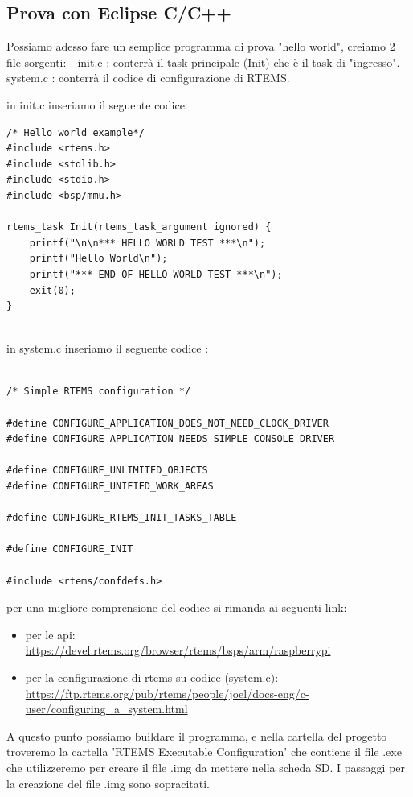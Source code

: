 \documentclass[12pt, a4paper]{article}
\begin{document}
\begin{flushleft}
\newpage
\section{Prova con Eclipse C/C++}

Possiamo adesso fare un semplice programma di prova "hello world",
creiamo 2 file sorgenti:
- init.c : conterrà il task principale (Init) che è il task di "ingresso".
- system.c : conterrà il codice di configurazione di RTEMS.

in init.c inseriamo il seguente codice:
\begin{lstlisting}[style=CStyle] 
/* Hello world example*/
#include <rtems.h>
#include <stdlib.h>
#include <stdio.h>
#include <bsp/mmu.h>

rtems_task Init(rtems_task_argument ignored) {
	printf("\n\n*** HELLO WORLD TEST ***\n");
	printf("Hello World\n");
	printf("*** END OF HELLO WORLD TEST ***\n");
	exit(0);
}


\end{lstlisting}
in system.c inseriamo il seguente codice :

\begin{lstlisting}[style=CStyle] 

/* Simple RTEMS configuration */

#define CONFIGURE_APPLICATION_DOES_NOT_NEED_CLOCK_DRIVER
#define CONFIGURE_APPLICATION_NEEDS_SIMPLE_CONSOLE_DRIVER

#define CONFIGURE_UNLIMITED_OBJECTS
#define CONFIGURE_UNIFIED_WORK_AREAS

#define CONFIGURE_RTEMS_INIT_TASKS_TABLE

#define CONFIGURE_INIT

#include <rtems/confdefs.h>

\end{lstlisting}

per una migliore comprensione del codice si rimanda ai seguenti link:
\begin{itemize}
\item per le api: \\ \url{https://devel.rtems.org/browser/rtems/bsps/arm/raspberrypi}
\item per la configurazione di rtems su codice (system.c):\\  \url{https://ftp.rtems.org/pub/rtems/people/joel/docs-eng/c-user/configuring_a_system.html}
\end{itemize}

A questo punto possiamo buildare il programma, e nella cartella del progetto troveremo la cartella 'RTEMS Executable Configuration' che contiene il file .exe che utilizzeremo per creare il file .img da mettere nella scheda SD.
I passaggi per la creazione del file .img sono sopracitati.


\end{flushleft}
\end{document}
